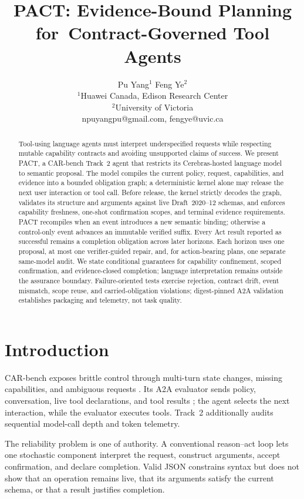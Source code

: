 \documentclass{article}
\title{PACT: Evidence-Bound Planning for\
Contract-Governed Tool Agents}
\author{
Pu Yang$^1$\And
Feng Ye$^2$\\
\affiliations
$^1$Huawei Canada, Edison Research Center\\
$^2$University of Victoria\\
\emails
npuyangpu@gmail.com, fengye@uvic.ca
}
\begin{document}
\maketitle

\begin{abstract}
Tool-using language agents must interpret underspecified requests while
respecting mutable capability contracts and avoiding unsupported claims of
success.  We present PACT, a CAR-bench Track~2 agent that restricts its
Cerebras-hosted language model to semantic proposal.  The model compiles the
current policy, request, capabilities, and evidence into a bounded obligation
graph; a deterministic kernel alone may release the next user interaction or
tool call.  Before release, the kernel strictly decodes the graph, validates
its structure and arguments against live Draft~2020--12 schemas, and enforces
capability freshness, one-shot confirmation scopes, and terminal evidence
requirements.  PACT recompiles when an event introduces a new semantic
binding; otherwise a control-only event advances an immutable verified suffix.
Every Act result reported as successful remains a completion obligation across
later horizons.  Each horizon uses one proposal, at most one verifier-guided
repair, and, for action-bearing plans, one separate same-model audit.  We state
conditional guarantees for capability confinement, scoped confirmation, and
evidence-closed completion; language interpretation remains outside the
assurance boundary.  Failure-oriented tests exercise rejection, contract drift,
event mismatch, scope reuse, and carried-obligation violations; digest-pinned
A2A validation establishes packaging and telemetry, not task quality.
\end{abstract}

\section{Introduction}

CAR-bench exposes brittle control through multi-turn state changes, missing
capabilities, and ambiguous requests \cite{kirmayr2026car}.  Its A2A evaluator
sends policy, conversation, live tool declarations, and tool results
\cite{a2a2026}; the agent selects the next interaction, while the evaluator
executes tools.  Track~2 additionally audits sequential model-call depth and
token telemetry.

The reliability problem is one of authority.  A conventional reason--act loop
lets one stochastic component interpret the request, construct arguments,
accept confirmation, and declare completion.  Valid JSON constrains syntax but
does not show that an operation remains live, that its arguments satisfy the
current schema, or that a result justifies completion.
\end{document}
